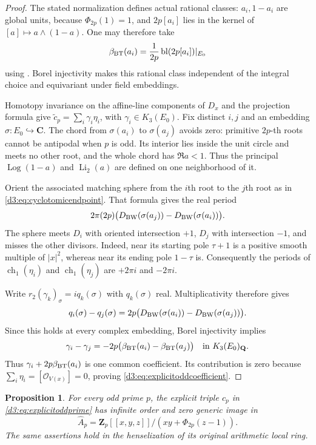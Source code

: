 \documentclass[11pt,a4paper]{amsart}
\numberwithin{equation}{section}
\newtheorem{proposition}[theorem]{Proposition}
\theoremstyle{definition}
\theoremstyle{remark}
\newcommand{\Q}{\mathbf Q}
\newcommand{\Z}{\mathbf Z}
\newcommand{\C}{\mathbf C}
\newcommand{\OO}{\mathcal O}
\begin{document}
\begin{proof}
The stated normalization defines actual rational classes:
$a_i,1-a_i$ are global units, because $\Phi_{2p}(1)=1$,
and $2p[a_i]$ lies in the kernel of
$[a]\mapsto a\wedge(1-a)$.
One may therefore take
\[
 \beta_{\rm BT}(a_i)=\frac1{2p}\operatorname{bl}(2p[a_i])|_{E_0}
\]
using \cite[Theorem~4.9 and identification~(4.8)]{BunkeTamme}.
Borel injectivity \cite[Section~6]{BunkeTamme} makes this rational class independent of the
integral choice and equivariant under field embeddings.

Homotopy invariance on the affine-line components of $D_x$ and
the projection formula give
$\widetilde c_p=\sum_i\gamma_i\eta_i$, with
$\gamma_i\in K_3(E_0)$.
Fix distinct $i,j$ and an embedding $\sigma:E_0\hookrightarrow\C$.
The chord from $\sigma(a_i)$ to $\sigma(a_j)$ avoids zero:
primitive $2p$-th roots cannot be antipodal when $p$ is odd.
Its interior lies inside the unit circle and meets no other root,
and the whole chord has $\Re a<1$. Thus the principal
$\operatorname{Log}(1-a)$ and $\operatorname{Li}_2(a)$ are defined
on one neighborhood of it.

Orient the associated matching sphere from the $i$th root to
the $j$th root as in \eqref{d3:eq:cyclotomicendpoint}.
That formula gives the real period
\[
 2\pi(2p)\bigl(D_{\rm BW}(\sigma(a_j))
                  -D_{\rm BW}(\sigma(a_i))\bigr).
\]
The sphere meets $D_i$ with oriented intersection $+1$,
$D_j$ with intersection $-1$, and misses the other divisors.
Indeed, near its starting pole $\tau+1$ is a positive smooth
multiple of $|x|^2$, whereas near its ending pole $1-\tau$ is.
Consequently the periods of $\operatorname{ch}_1(\eta_i)$
and $\operatorname{ch}_1(\eta_j)$ are $+2\pi i$ and $-2\pi i$.

Write $r_2(\gamma_k)_\sigma=iq_k(\sigma)$ with $q_k(\sigma)$ real.
Multiplicativity therefore gives
\[
 q_i(\sigma)-q_j(\sigma)
 =2p\bigl(D_{\rm BW}(\sigma(a_i))
                  -D_{\rm BW}(\sigma(a_j))\bigr).
\]
Since this holds at every complex embedding, Borel injectivity
implies
\[
 \gamma_i-\gamma_j
 =-2p\bigl(\beta_{\rm BT}(a_i)-\beta_{\rm BT}(a_j)\bigr)
 \quad\text{in }K_3(E_0)_{\Q}.
\]
Thus $\gamma_i+2p\beta_{\rm BT}(a_i)$ is one common coefficient.
Its contribution is zero because
$\sum_i\eta_i=[\OO_{V(x)}]=0$, proving
\eqref{d3:eq:explicitoddcoefficient}.
\end{proof}

\begin{proposition}\label{d3:prop:explicitoddcomplete}
For every odd prime $p$, the explicit triple $c_p$ in
\eqref{d3:eq:explicitoddprime} has infinite order and zero generic
image in
\[
 \widehat A_p=\Z_p[[x,y,z]]/(xy+\Phi_{2p}(z-1)).
\]
The same assertions hold in the henselization of its original
arithmetic local ring.
\end{proposition}
\end{document}
